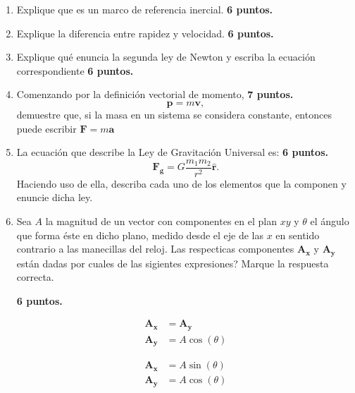 \documentclass[]{article}
\begin{document}
\begin{enumerate}
\item Explique que es un marco de referencia inercial.
\hfill \textbf{6 puntos.}

\item Explique la diferencia entre rapidez y velocidad.
\hfill \textbf{6 puntos.}

\item Explique qu\'e enuncia la segunda ley de Newton y escriba la ecuaci\'on
correspondiente
\hfill \textbf{6 puntos.}

\item Comenzando por la definici\'on vectorial de momento, 
\hfill \textbf{7 puntos.}
\begin{equation*}
\boldsymbol{p} = m \boldsymbol{v},
\end{equation*}
demuestre que, si la masa en un sistema se considera constante, entonces
puede escribir $\boldsymbol{F} = m \boldsymbol{a}$

\item La ecuaci\'on que describe la Ley de Gravitaci\'on Universal es:
\hfill \textbf{6 puntos.}
\begin{equation*}
\boldsymbol{F_{g}} = G \frac{m_{1}m_{2}}{r^{2}}\boldsymbol{\hat{r}}.
\end{equation*}
Haciendo uso de ella, describa cada uno de los elementos que la componen y
enuncie dicha ley.

\item Sea $A$ la magnitud de un vector con componentes en el plan $xy$ y
$\theta$ el \'angulo que forma \'este en dicho plano, medido desde el eje de las
$x$ en sentido contrario a las manecillas del reloj. Las respecticas componentes
$\boldsymbol{A_{x}}$ y $\boldsymbol{A_{y}}$ est\'an dadas por cuales de las
sigientes expresiones? Marque la respuesta correcta. 

\hfill \textbf{6 puntos.}
\vspace{-10mm}
\begin{multicols}{4}
\begin{align*}
\boldsymbol{A_{x}} &= \boldsymbol{A_{y}} \\
\boldsymbol{A_{y}} &= A\cos(\theta)
\end{align*}

\begin{align*}
\boldsymbol{A_{x}} &= A\sin(\theta) \\
\boldsymbol{A_{y}} &= A\cos(\theta)
\end{align*}


\end{multicols}
\end{enumerate}
\end{document}
